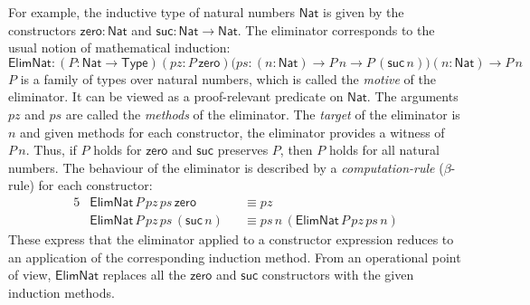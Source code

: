 \documentclass[a4paper,UKenglish]{lipics-v2018}
\newcommand{\ra}{\rightarrow}
\newcommand{\Nat}{\mathsf{Nat}}
\newcommand{\zero}{\mathsf{zero}}
\newcommand{\suc}{\mathsf{suc}}
\newcommand{\Elim}{\mathsf{Elim}}
\newcommand{\Rec}{\mathsf{Rec}}
\newcommand{\1}{\mathsf{1}} \renewcommand{\Pr}{\mathsf{Pr}}
\begin{document}
For example, the inductive type of natural numbers $\Nat$ is given by
the constructors $\zero:\Nat$ and $\suc:\Nat \ra \Nat$. The
eliminator corresponds to the usual notion of mathematical induction:
\[
  \Elim\Nat:(P:\Nat \ra \mathsf{Type})(pz: P\,\zero)\big(ps:(n:\Nat)\ra P\,n\ra P\,(\suc\,n)\big)(n:\Nat)\ra P\,n
\]
$P$ is a family of types over natural numbers, which is called the
\emph{motive} of the eliminator. It can be viewed as a proof-relevant
predicate on $\Nat$. The arguments $pz$ and $ps$ are called the
\emph{methods} of the eliminator. The \emph{target} of the eliminator
is $n$ and given methods for each constructor, the eliminator provides
a witness of $P\,n$. Thus, if $P$ holds for $\zero$ and $\suc$
preserves $P$, then $P$ holds for all natural numbers. The behaviour
of the eliminator is described by a \emph{computation-rule}
($\beta$-rule) for each constructor:
\begin{alignat*}{5}
  & \Elim\Nat\,P\,pz\,ps\,\zero && \equiv pz \\
  & \Elim\Nat\,P\,pz\,ps\,(\suc\,n) && \equiv ps\,n\,(\Elim\Nat\,P\,pz\,ps\,n)
\end{alignat*}
These express that the eliminator applied to a constructor expression
reduces to an application of the corresponding induction method. From
an operational point of view, $\Elim\Nat$ replaces all the $\zero$ and
$\suc$ constructors with the given induction methods.

\end{document}
